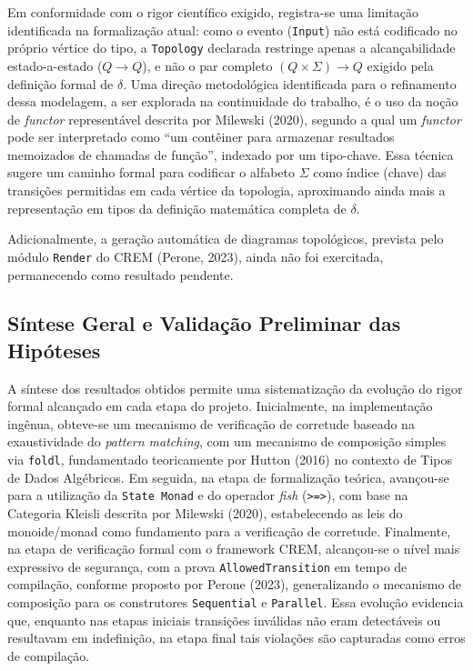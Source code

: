 \documentclass[12pt,a4paper]{article}
\begin{document}
Em conformidade com o rigor científico exigido, registra-se uma limitação identificada na formalização atual: como o evento (\texttt{Input}) não está codificado no próprio vértice do tipo, a \texttt{Topology} declarada restringe apenas a alcançabilidade estado-a-estado ($Q \to Q$), e não o par completo $(Q \times \Sigma) \to Q$ exigido pela definição formal de $\delta$. Uma direção metodológica identificada para o refinamento dessa modelagem, a ser explorada na continuidade do trabalho, é o uso da noção de \textit{functor} representável descrita por Milewski (2020), segundo a qual um \textit{functor} pode ser interpretado como ``um contêiner para armazenar resultados memoizados de chamadas de função'', indexado por um tipo-chave. Essa técnica sugere um caminho formal para codificar o alfabeto $\Sigma$ como índice (chave) das transições permitidas em cada vértice da topologia, aproximando ainda mais a representação em tipos da definição matemática completa de $\delta$.

Adicionalmente, a geração automática de diagramas topológicos, prevista pelo módulo \texttt{Render} do CREM (Perone, 2023), ainda não foi exercitada, permanecendo como resultado pendente.

\subsection{Síntese Geral e Validação Preliminar das Hipóteses}

A síntese dos resultados obtidos permite uma sistematização da evolução do rigor formal alcançado em cada etapa do projeto. Inicialmente, na implementação ingênua, obteve-se um mecanismo de verificação de corretude baseado na exaustividade do \textit{pattern matching}, com um mecanismo de composição simples via \texttt{foldl}, fundamentado teoricamente por Hutton (2016) no contexto de Tipos de Dados Algébricos. Em seguida, na etapa de formalização teórica, avançou-se para a utilização da \texttt{State Monad} e do operador \textit{fish} (\texttt{>=>}), com base na Categoria Kleisli descrita por Milewski (2020), estabelecendo as leis do monoide/monad como fundamento para a verificação de corretude. Finalmente, na etapa de verificação formal com o framework CREM, alcançou-se o nível mais expressivo de segurança, com a prova \texttt{AllowedTransition} em tempo de compilação, conforme proposto por Perone (2023), generalizando o mecanismo de composição para os construtores \texttt{Sequential} e \texttt{Parallel}. Essa evolução evidencia que, enquanto nas etapas iniciais transições inválidas não eram detectáveis ou resultavam em indefinição, na etapa final tais violações são capturadas como erros de compilação.
\end{document}
